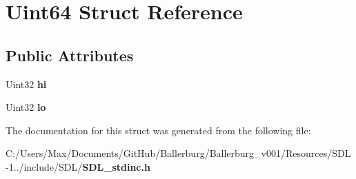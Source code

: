 \section{Uint64 Struct Reference}
\label{struct_uint64}
\subsection*{Public Attributes}
\begin{DoxyCompactItemize}
\item 
Uint32 {\bfseries hi}\label{struct_uint64_aebe59cbeb37832b60d27071eca9fef3f}

\item 
Uint32 {\bfseries lo}\label{struct_uint64_a110735976529c94010e0e1ff33bcb116}

\end{DoxyCompactItemize}


The documentation for this struct was generated from the following file\+:\begin{DoxyCompactItemize}
\item 
C\+:/\+Users/\+Max/\+Documents/\+Git\+Hub/\+Ballerburg/\+Ballerburg\+\_\+v001/\+Resources/\+S\+D\+L-\/1../include/\+S\+D\+L/{\bf S\+D\+L\+\_\+stdinc.\+h}\end{DoxyCompactItemize}
